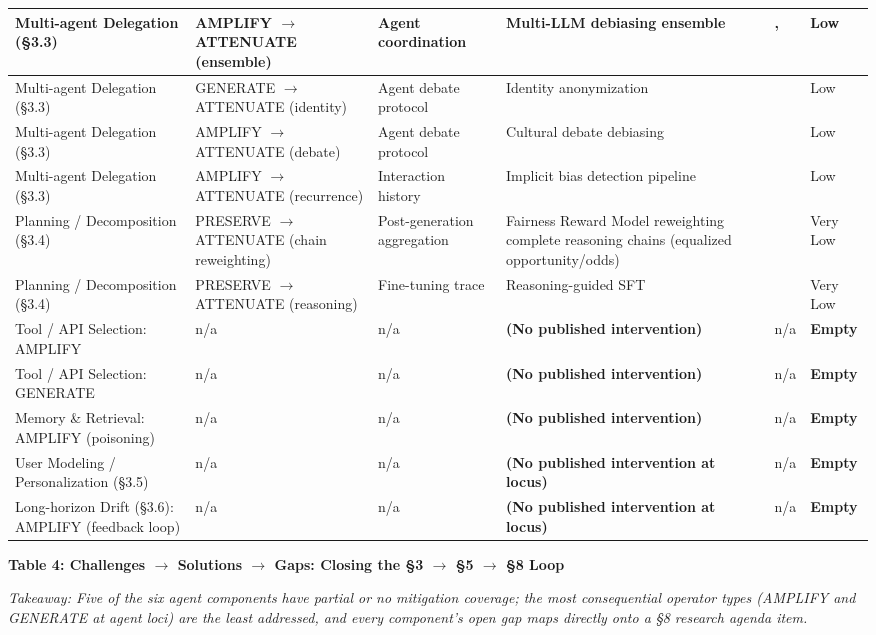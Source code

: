 \documentclass[10pt]{article}
\begin{document}
\begin{center}
\begin{longtable}{|p{}|p{}|p{}|p{}|p{}|p{}|}
Multi-agent Delegation (\S{}3.3) & AMPLIFY $\rightarrow$ ATTENUATE (ensemble) & Agent coordination & Multi-LLM debiasing ensemble & \cite{owens2024multi}, \cite{xu2024mitigating} & Low \\ \hline
Multi-agent Delegation (\S{}3.3) & GENERATE $\rightarrow$ ATTENUATE (identity) & Agent debate protocol & Identity anonymization & \cite{choi2025identity} & Low \\ \hline
Multi-agent Delegation (\S{}3.3) & AMPLIFY $\rightarrow$ ATTENUATE (debate) & Agent debate protocol & Cultural debate debiasing & \cite{ki2025multiple} & Low \\ \hline
Multi-agent Delegation (\S{}3.3) & AMPLIFY $\rightarrow$ ATTENUATE (recurrence) & Interaction history & Implicit bias detection pipeline & \cite{borah2024implicit} & Low \\ \hline
Planning / Decomposition (\S{}3.4) & PRESERVE $\rightarrow$ ATTENUATE (chain reweighting) & Post-generation aggregation & Fairness Reward Model reweighting complete reasoning chains (equalized opportunity/odds) & \cite{hall2025guiding} & Very Low \\ \hline
Planning / Decomposition (\S{}3.4) & PRESERVE $\rightarrow$ ATTENUATE (reasoning) & Fine-tuning trace & Reasoning-guided SFT & \cite{kabra2025reasoning} & Very Low \\ \hline
Tool / API Selection: AMPLIFY & n/a & n/a & \textbf{(No published intervention)} & n/a & \textbf{Empty} \\ \hline
Tool / API Selection: GENERATE & n/a & n/a & \textbf{(No published intervention)} & n/a & \textbf{Empty} \\ \hline
Memory \& Retrieval: AMPLIFY (poisoning) & n/a & n/a & \textbf{(No published intervention)} & n/a & \textbf{Empty} \\ \hline
User Modeling / Personalization (\S{}3.5) & n/a & n/a & \textbf{(No published intervention at locus)} & n/a & \textbf{Empty} \\ \hline
Long-horizon Drift (\S{}3.6): AMPLIFY (feedback loop) & n/a & n/a & \textbf{(No published intervention at locus)} & n/a & \textbf{Empty} \\ \hline
\end{longtable}\end{center}


\textbf{Table 4: Challenges $\rightarrow$ Solutions $\rightarrow$ Gaps: Closing the \S{}3 $\rightarrow$ \S{}5 $\rightarrow$ \S{}8 Loop}

\emph{Takeaway: Five of the six agent components have partial or no mitigation coverage; the most consequential operator types (AMPLIFY and GENERATE at agent loci) are the least addressed, and every component's open gap maps directly onto a \S{}8 research agenda item.}
\end{document}

